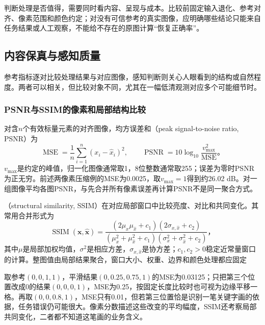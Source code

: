 判断处理是否值得，需要同时看内容、呈现与成本。比较前固定输入退化、参考对齐、像素范围和颜色约定；对没有可信参考的真实图像，应明确哪些结论只能来自任务结果或人工观察，不能给不存在的原图计算“恢复正确率”。

\subsection{内容保真与感知质量}
\label{sec:vision-restoration-quality}

参考指标逐对比较处理结果与对应图像，感知判断则关心人眼看到的结构或自然程度。两者可以相关，但比较对象不同，尤其在一幅低清观测对应多个可能细节时。

\subsubsection{PSNR与SSIM的像素和局部结构比较}
\label{sec:vision-restoration-psnr-ssim}

对含$n$个有效标量元素的对齐图像，均方误差和（peak signal-to-noise ratio, PSNR）为
\begin{equation}
 \operatorname{MSE}=\frac1n\sum_{i=1}^{n}(x_i-\hat x_i)^2,
 \qquad
 \operatorname{PSNR}
 =10\log_{10}\frac{v_{\max}^2}{\operatorname{MSE}}\text{。}
 \label{eq:vision-psnr}
\end{equation}
$v_{\max}$是约定的峰值，归一化图像通常取1，8位整数通常取255；误差为零时PSNR为正无穷。前述两像素压缩例的MSE为0.0025，取$v_{\max}=1$得到约26.02 dB。对一组图像平均各图PSNR，与先合并所有像素误差再计算PSNR不是同一聚合方式。

（structural similarity, SSIM）在对应局部窗口中比较亮度、对比和共同变化。其常用合并形式为
\begin{equation}
 \operatorname{SSIM}(\bm{x},\hat{\bm{x}})
 =
 \frac{(2\mu_x\mu_{\hat x}+c_1)(2\sigma_{x,\hat x}+c_2)}
 {(\mu_x^2+\mu_{\hat x}^2+c_1)
  (\sigma_x^2+\sigma_{\hat x}^2+c_2)}\text{，}
 \label{eq:vision-ssim}
\end{equation}
其中$\mu$是局部加权均值，$\sigma^2$是相应方差，$\sigma_{x,\hat x}$是协方差；$c_1,c_2>0$稳定近常量窗口的计算。整图值由局部结果聚合，窗口大小、权重、边界和颜色处理都应固定

取参考$(0,0,1,1)$，平滑结果$(0,0.25,0.75,1)$的MSE为0.03125；只把第三个位置改成0的结果$(0,0,0,1)$，MSE为0.25，按固定长度比较时也可视为边缘平移一格。再取$(0,0,0.8,1)$，MSE只有0.01，但若第三位置恰是识别一笔关键字画的依据，任务错误仍可能很大。像素分数描述这些改变的平均幅度，SSIM还考察局部共同变化，二者都不知道这笔画的业务含义。


